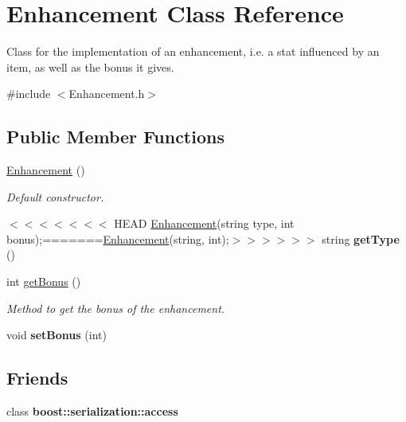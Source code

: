 \hypertarget{class_enhancement}{}\section{Enhancement Class Reference}
\label{class_enhancement}


Class for the implementation of an enhancement, i.\+e. a stat influenced by an item, as well as the bonus it gives.  




{\ttfamily \#include $<$Enhancement.\+h$>$}

\subsection*{Public Member Functions}
\begin{DoxyCompactItemize}
\item 
\hypertarget{class_enhancement_ab348c08841ab57c76daa7c3eab2ad4a3}{}\label{class_enhancement_ab348c08841ab57c76daa7c3eab2ad4a3} 
\hyperlink{class_enhancement_ab348c08841ab57c76daa7c3eab2ad4a3}{Enhancement} ()
\begin{DoxyCompactList}\small\item\em Default constructor. \end{DoxyCompactList}\item 
\hypertarget{class_enhancement_a202f69a38ce77d83f2dc536b793cc5bf}{}\label{class_enhancement_a202f69a38ce77d83f2dc536b793cc5bf} 
$<$$<$$<$$<$$<$$<$$<$ H\+E\+AD \hyperlink{class_enhancement}{Enhancement}(string type, int bonus);=======\hyperlink{class_enhancement}{Enhancement}(string, int);$>$$>$$>$$>$$>$$>$ string {\bfseries get\+Type} ()
\item 
\hypertarget{class_enhancement_afd0ea7d414468cf507a4673fd066fd89}{}\label{class_enhancement_afd0ea7d414468cf507a4673fd066fd89} 
int \hyperlink{class_enhancement_afd0ea7d414468cf507a4673fd066fd89}{get\+Bonus} ()
\begin{DoxyCompactList}\small\item\em Method to get the bonus of the enhancement. \end{DoxyCompactList}\item 
\hypertarget{class_enhancement_a01af1fd499599912e18fa11124f8dff9}{}\label{class_enhancement_a01af1fd499599912e18fa11124f8dff9} 
void {\bfseries set\+Bonus} (int)
\end{DoxyCompactItemize}
\subsection*{Friends}
\begin{DoxyCompactItemize}
\item 
\hypertarget{class_enhancement_ac98d07dd8f7b70e16ccb9a01abf56b9c}{}\label{class_enhancement_ac98d07dd8f7b70e16ccb9a01abf56b9c} 
class {\bfseries boost\+::serialization\+::access}
\end{DoxyCompactItemize}



